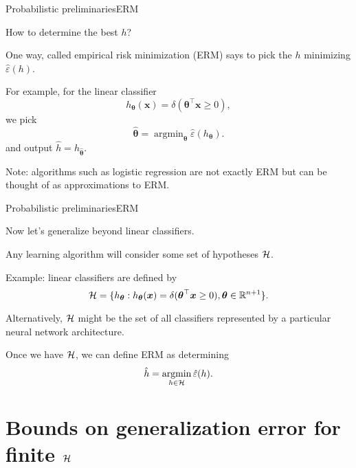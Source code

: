 \documentclass{beamer}
\renewcommand{\vec}[1]{\boldsymbol{#1}}
\def\Rset{\mathbb{R}}
\DeclareMathOperator*{\argmin}{argmin}
\begin{document}
\begin{frame}{Probabilistic preliminaries}{ERM}

  How to determine the best $h$?

  \medskip

  One way, called \alert{empirical risk minimization} (ERM) says to
  pick the $h$ minimizing $\hat{\varepsilon}(h)$.

  \medskip

  For example, for the linear classifier
  \[ h_{\vec{\theta}}(\vec{x}) = \delta(\vec{\theta}^\top \vec{x} \ge 0),\]
  we pick
  \[ \hat{\vec{\theta}} = \argmin_{\vec{\theta}}\hat{\varepsilon}(h_{\vec{\theta}}) . \]
  and output $\hat{h}=h_{\hat{\vec{\theta}}}$.

  \medskip

  Note: algorithms such as logistic regression are not exactly ERM but
  can be thought of as approximations to ERM.

\end{frame}


\begin{frame}{Probabilistic preliminaries}{ERM}

  Now let's generalize beyond linear classifiers.

  \medskip
  
  Any learning algorithm will consider some set of
  hypotheses $\cal H$.

  \medskip

  Example: linear classifiers are defined by
  \[ {\cal H} = \{ h_{\vec{\theta}} : h_{\vec{\theta}}(\vec{x}) =
  \delta(\vec{\theta}^\top \vec{x} \ge 0), \vec{\theta} \in \Rset^{n+1}\}.
  \]

  Alternatively, ${\cal H}$ might be the set of all classifiers
  represented by a particular neural network architecture.

  \medskip
  
  Once we have $\cal H$, we can define ERM as determining
  \[ \hat{h} = \argmin_{h\in\cal H}\hat{\varepsilon}(h). \]
     
\end{frame}

\section{Bounds on generalization error for finite $\cal H$}
\end{document}
